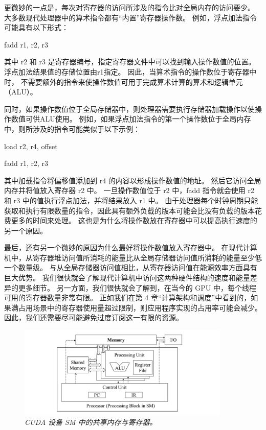 更微妙的一点是，每次对寄存器的访问所涉及的指令比对全局内存的访问要少。 
大多数现代处理器中的算术指令都有“内置”寄存器操作数。 例如，浮点加法指令可能具有以下形式：

fadd r1, r2, r3

其中 r2 和 r3 是寄存器编号，指定寄存器文件中可以找到输入操作数值的位置。 
浮点加法结果值的存储位置由r1指定。 因此，当算术指令的操作数位于寄存器中时，
不需要额外的指令来使操作数值可用于完成算术计算的算术和逻辑单元（ALU）。

同时，如果操作数值位于全局存储器中，则处理器需要执行存储器加载操作以使操作数值可供ALU使用。 
例如，如果浮点加法指令的第一个操作数位于全局内存中，则所涉及的指令可能类似于以下示例：

load r2, r4, offset

fadd r1, r2, r3

其中加载指令将偏移值添加到 r4 的内容以形成操作数值的地址。 然后它访问全局内存并将值放入寄存器 r2 中。 
一旦操作数值位于 r2 中，fadd 指令就会使用 r2 和 r3 中的值执行浮点加法，并将结果放入 r1 中。 
由于处理器每个时钟周期只能获取和执行有限数量的指令，因此具有额外负载的版本可能会比没有负载的版本花费更多的时间来处理。 
这也是为什么将操作数放在寄存器中可以提高执行速度的另一个原因。

最后，还有另一个微妙的原因为什么最好将操作数值放入寄存器中。 
在现代计算机中，从寄存器堆访问值所消耗的能量比从全局存储器访问值所消耗的能量至少低一个数量级。 
与从全局存储器访问值相比，从寄存器访问值在能源效率方面具有巨大优势。 
我们很快就会了解现代计算机中访问这两种硬件结构的速度和能量差异的更多细节。 
另一方面，我们很快就会了解到，在当今的 GPU 中，每个线程可用的寄存器数量非常有限。 
正如我们在第 4 章“计算架构和调度”中看到的，如果满占用场景中的寄存器使用量超过限制，则应用程序实现的占用率可能会减少。 
因此，我们还需要尽可能避免过度订阅这一有限的资源。

\begin{figure}[H]
	\centering
	\includegraphics[width=0.9\textwidth]{figs/F5.4.png}
	\caption{\textit{CUDA 设备 SM 中的共享内存与寄存器。}}
\end{figure}

